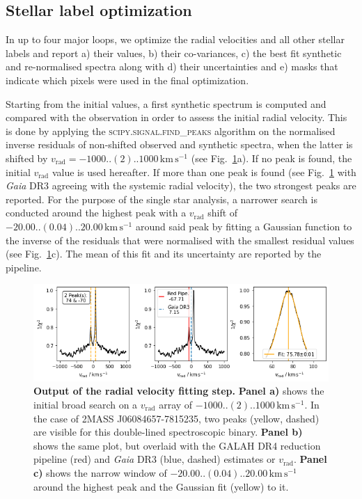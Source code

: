 \documentclass[
  journal=pasa,
  manuscript=research-paper, %
  year=2024,
  volume=37
]{cup-journal}
\newcommand{\vrad}{$v_\mathrm{rad}$\xspace}
\newcommand{\Gaia}{\textit{Gaia}\xspace}
\newcommand{\kms}{\,\mathrm{km\,s^{-1}}}	%
\begin{document}
\subsection{Stellar label optimization}
\label{sec:stellar_label_optimization}

In up to four major loops, we optimize the radial velocities and all other stellar labels and report a) their values, b) their co-variances, c) the best fit synthetic and re-normalised spectra along with d) their uncertainties and e) masks that indicate which pixels were used in the final optimization.

Starting from the initial values, a first synthetic spectrum is computed and compared with the observation in order to assess the initial radial velocity. This is done by applying the \textsc{scipy.signal.find\_peaks} algorithm on the normalised inverse residuals of non-shifted observed and synthetic spectra, when the latter is shifted by $v_\text{rad} = -1000..(2)..1000\kms$ (see Fig.~\ref{fig:181221003101356_single_fit_rv}a). If no peak is found, the initial \vrad value is used hereafter. If more than one peak is found (see Fig.~\ref{fig:181221003101356_single_fit_rv} with \Gaia DR3 agreeing with the systemic radial velocity), the two strongest peaks are reported. For the purpose of the single star analysis, a narrower search is conducted around the highest peak with a \vrad shift of $-20.00..(0.04)..20.00\kms$ around said peak by fitting a Gaussian function to the inverse of the residuals that were normalised with the smallest residual values (see Fig.~\ref{fig:181221003101356_single_fit_rv}c). The mean of this fit and its uncertainty are reported by the pipeline.

\begin{figure}[hbt]
\centering
\includegraphics[width=\textwidth]{figures/181221003101356_single_fit_rv.png}
\caption{\textbf{Output of the radial velocity fitting step.} \textbf{Panel a)} shows the initial broad search on a \vrad array of $-1000..(2)..1000\kms$. In the case of 2MASS J06084657-7815235, two peaks (yellow, dashed) are visible for this double-lined spectroscopic binary. \textbf{Panel b)} shows the same plot, but overlaid with the GALAH DR4 reduction pipeline (red) and \Gaia DR3 (blue, dashed) estimates or \vrad. \textbf{Panel c)} shows the narrow window of $-20.00..(0.04)..20.00\kms$ around the highest peak and the Gaussian fit (yellow) to it.}
\label{fig:181221003101356_single_fit_rv}
\end{figure}
\end{document}
